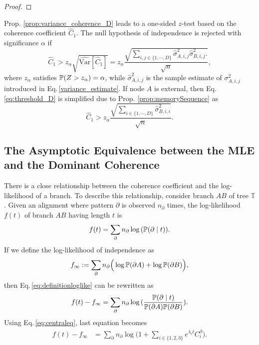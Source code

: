 \begin{appendices}
\begin{proof}
\end{proof}


Prop. \ref{prop:variance_coherence_D} leads to a one-sided $z$-test based on the coherence coefficient $\hat{C}_1$. The null hypothesis of independence is rejected with significance $\alpha$ if 
\begin{equation} \label{eq:threshold_D}
     \hat{C}_1 >  z_\alpha \sqrt{
     {\mathrm{\widehat{Var}}}[\hat{C}_1]
     } = z_\alpha \frac{\sqrt{\sum_{i, j \in \{1,\cdots, D\}} 
   \hat{\sigma}^2_{A,i,j}   \hat{\sigma}^2_{B,i,j}.
}}{\sqrt{n}},
\end{equation} where $z_\alpha$ satisfies $\mathbb{P}(Z > z_\alpha) = \alpha$, while $\hat{\sigma}^2_{A,i,j}$ is the sample estimate of $\sigma^2_{A,i,j}$ introduced in Eq.\,\eqref{variance_estimate}. If node $A$ is external, then Eq. \ref{eq:threshold_D} is simplified due to Prop. \ref{prop:memorySequence} as 
\begin{equation} \label{eq:threshold_D_external}
     \hat{C}_1 > z_\alpha \frac{\sqrt{\sum_{i\in \{1,\cdots, D\}}  \hat{\sigma}^2_{B,i,i}
}}{\sqrt{n}}.
\end{equation}
\bigskip

\subsection{The Asymptotic Equivalence between the MLE and the Dominant Coherence
}
\label{sec:asym_phylo_tree}

There is a close relationship between the coherence coefficient and the log-likelihood of a branch. To describe this relationship, consider branch $AB$ of tree $\mathbb{T}$. Given an alignment where pattern $\partial$ is observed $n_\partial$ times, the log-likelihood $f(t)$ of branch $AB$ having length $t$ is
\begin{equation}\label{eq:definitionloglike}
f(t) = 
\sum_\partial n_\partial \log{(\mathbb{P}(\partial \mid t))}.
\end{equation}
If we define the log-likelihood of independence as 
 \begin{equation} \label{eq:DIFLoglikelihood}
 {f_\infty := \sum_\partial n_\partial \Big(\log\mathbb{P}({\partial A})+  \log\mathbb{P}({\partial B})\Big)}, 
 \end{equation}
 then Eq.\,\eqref{eq:definitionloglike} can be rewritten as 
\begin{equation}\label{eq:definitionloglike2}
f(t) -f_\infty= 
\sum_\partial n_\partial \log{(\frac{\mathbb{P}(\partial \mid t)}{\mathbb{P}({\partial A})\mathbb{P}({\partial B})})}.
\end{equation}
    Using Eq.\,\eqref{eq:centraleq}, last equation becomes
 \begin{align} 
     \label{eq:efficient_likelihood_2}
     f(t)-f_\infty &=  \sum_{\partial} n_\partial \log \Big( 1+  \sum_{i \in \{1,2,3\}} e^{\lambda_it}  C_i^\partial\Big).
 \end{align} 
 

\end{appendices}
